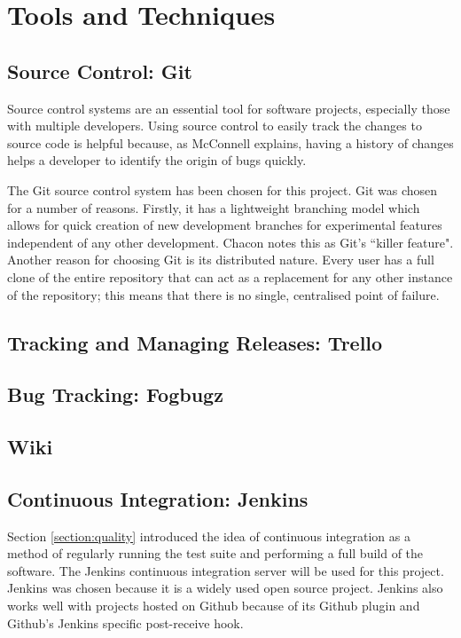 \section{Tools and Techniques}

\subsection{Source Control: Git}

Source control systems are an essential tool for software projects, especially those
with multiple developers. Using source control to easily track the changes to source
code is helpful because, as McConnell explains, having a history of changes helps a
developer to identify the origin of bugs quickly.

The Git source control system has been chosen for this project.
Git was chosen for a number of reasons. Firstly, it has a lightweight branching model which
allows for quick creation of new development branches for experimental features independent of
any other development. Chacon notes this as Git's ``killer feature".
Another reason for choosing Git is its distributed nature. Every user has a full clone of the
entire repository that can act as a replacement for any other instance of the repository; this means
that there is no single, centralised point of failure.

\subsection{Tracking and Managing Releases: Trello}

\subsection{Bug Tracking: Fogbugz}

\subsection{Wiki}

\subsection{Continuous Integration: Jenkins}

Section \ref{section:quality} introduced the idea of continuous integration as a method
of regularly running the test suite and performing a full build of the software.
The Jenkins continuous integration server
will be used for this project. Jenkins was chosen because it is a widely used open
source project.
Jenkins also works well with projects hosted on Github because of its Github plugin
and Github's Jenkins specific post-receive hook.

